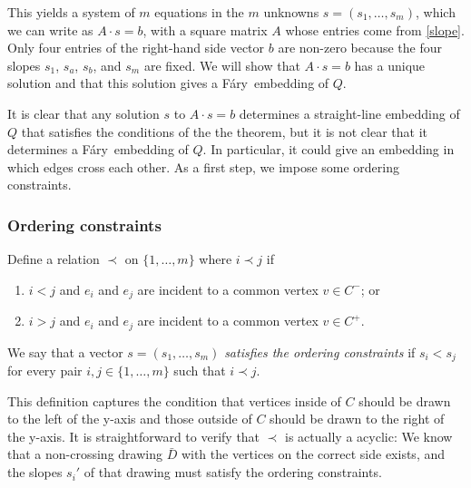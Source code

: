 \documentclass{patmorin}
\newcommand{\Fary}{Fáry}
\begin{document}
This yields a system of $m$ equations
in the $m$ unknowns $s=(s_1,\ldots,s_m)$, which we can write
as
 $A\cdot s = b$, with a square matrix $A$ whose entries come from
 \eqref{slope}.
Only four entries of
the right-hand side vector
 $b$
are non-zero because the four slopes $s_1$, $s_a$, $s_b$, and $s_m$
are fixed. %
We will show that $A\cdot s=b$ has a unique
solution and that this solution gives a \Fary\ embedding of $Q$.

It is clear that any solution $s$ to $A\cdot s=b$ determines a
straight-line embedding of $Q$ that satisfies the conditions of the the
theorem, but it is not clear that it determines a \Fary\ embedding of $Q$.
In particular, it could give an embedding in which edges cross each other.
As a first step, we impose %
some
ordering constraints.

\subsubsection{Ordering constraints}

Define a relation $\prec$ on $\{1,\ldots,m\}$ where $i \prec j$
if
\begin{enumerate}
  \item $i < j$ and $e_i$ and $e_j$ are incident to a common vertex
  $v\in C^-$; or
  \item $i > j$ and $e_i$ and $e_j$ are incident to a common vertex $v\in C^+$.
\end{enumerate}
We say that a vector $s=(s_1,\ldots,s_m)$ \emph{satisfies the ordering constraints} if $s_i <
s_j$ for every pair $i,j\in\{1,\ldots,m\}$ such that $i\prec j$.  

This definition captures the condition that vertices inside of $C$
should be drawn to the left of the y-axis and those outside of $C$
should be drawn to the right of the y-axis.  It is straightforward
to verify that $\prec$ is actually a acyclic: We know that a
non-crossing drawing
$\bar D$ with the vertices on the correct side exists, and the slopes
$s_i'$ of that drawing must satisfy the ordering constraints.
\end{document}
